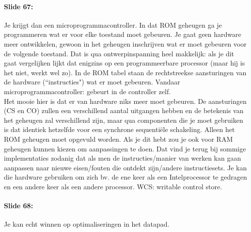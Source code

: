 \documentclass[10pt,a4paper]{book}
\begin{document}
\paragraph{Slide 67:} Je krijgt dan een microprogrammacontroller. In dat ROM geheugen ga je programmeren wat er voor elke toestand moet gebeuren. Je gaat geen hardware meer ontwikkelen, gewoon in het geheugen inschrijven wat er moet gebeuren voor de volgende toestand. Dat is qua ontwerpinspanning heel makkelijk: als je dit gaat vergelijken lijkt dat enigzins op een programmeerbare processor (maar hij is het niet, werkt wel zo). In de ROM tabel staan de rechtstreekse aansturingen van de hardware (``instructies") wat er moet gebeuren. Vandaar microprogrammacontroller: gebeurt in de controller zelf.\\
Het mooie hier is dat er van hardware niks meer moet gebeuren. De aansturingen (CS en CO) zullen een verschillend aantal uitgangen hebben en de betekenis van het geheugen zal verschillend zijn, maar qua componenten die je moet gebruiken is dat identiek hetzelfde voor een synchrone sequenti\"ele schakeling. Alleen het ROM geheugen moet opgevuld worden. Als je dit hebt zou je ook voor RAM geheugen kunnen kiezen om aanpassingen te doen. Dat vind je terug bij sommige implementaties zodanig dat als men de instructies/manier van werken kan gaan aanpassen naar nieuwe eisen/fouten die ontdekt zijn/andere instructiesets. Je kan die hardware gebruiken om zich bv. de ene keer als een Intelprocessor te gedragen en een andere keer als een andere processor. WCS: writable control store.

\paragraph{Slide 68:} Je kan echt winnen op optimaliseringen in het datapad.
\end{document}
